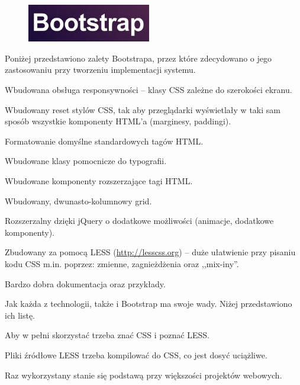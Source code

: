 \begin{figure}
  \begin{center}
    \includegraphics[width=0.48\textwidth]{img/logos/bootstrap.jpg}
  \end{center}
\end{figure}

Poniżej przedstawiono zalety Bootstrapa, przez które zdecydowano o jego zastosowaniu przy tworzeniu implementacji systemu.
\begin{packed_item}
    \item{Wbudowana obsługa responsywności -- klasy CSS zależne do szerokości ekranu.}
    \item{Wbudowany reset stylów CSS, tak aby przeglądarki wyświetlały w taki sam sposób wszystkie komponenty HTML'a (marginesy, paddingi).}
    \item{Formatowanie domyślne standardowych tagów HTML.}
    \item{Wbudowane klasy pomocnicze do typografii.}
    \item{Wbudowane komponenty rozszerzające tagi HTML.}
    \item{Wbudowany, dwunasto-kolumnowy grid.}
    \item{Rozszerzalny dzięki jQuery o dodatkowe możliwości (animacje, dodatkowe komponenty).}
    \item{Zbudowany za pomocą LESS (\url{http://lesscss.org}) -- duże ułatwienie przy pisaniu kodu CSS m.in. poprzez: zmienne, zagnieżdżenia oraz ,,mix-iny''.}
    \item{Bardzo dobra dokumentacja oraz przykłady.}
\end{packed_item}

Jak każda z technologii, także i Bootstrap ma swoje wady. Niżej przedstawiono ich listę.
\begin{packed_item}
    \item{Aby w pełni skorzystać trzeba znać CSS i poznać LESS.}
    \item{Pliki źródłowe LESS trzeba kompilować do CSS, co jest dosyć uciążliwe.}
    \item{Raz wykorzystany stanie się podstawą przy większości projektów webowych.}
\end{packed_item}

